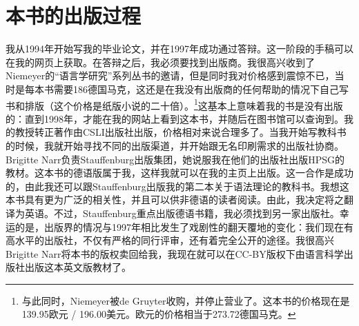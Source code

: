 \section*{本书的出版过程}

我从1994年开始写我的毕业论文，并在1997年成功通过答辩。这一阶段的手稿可以在我的网页上获取。在答辩之后，我必须要找到出版商。我很高兴收到了Niemeyer的“语言学研究”系列丛书的邀请，但是同时我对价格感到震惊不已，当时是每本书需要186德国马克，这还是在我没有出版商的任何帮助的情况下自己写书和排版（这个价格是纸版小说的二十倍）。\footnote{%
与此同时，Niemeyer被de Gruyter收购，并停止营业了。这本书的价格现在是139.95欧元 / 196.00美元。欧元的价格相当于273.72德国马克。
}这基本上意味着我的书是没有出版的：直到1998年，才能在我的网站上看到这本书，并随后在图书馆可以查询到。我的教授转正著作由CSLI出版社出版，价格相对来说合理多了。当我开始写教科书的时候，我就开始寻找不同的出版渠道，并开始跟无名印刷需求的出版社协商。Brigitte Narr负责Stauffenburg出版集团，她说服我在他们的出版社出版HPSG的教材。这本书的德语版属于我，这样我就可以在我的主页上出版。这一合作是成功的，由此我还可以跟Stauffenburg出版我的第二本关于语法理论的教科书。我想这本书具有更为广泛的相关性，并且可以供非德语的读者阅读。由此，我决定将之翻译为英语。不过，Stauffenburg重点出版德语书籍，我必须找到另一家出版社。幸运的是，出版界的情况与1997年相比发生了戏剧性的翻天覆地的变化：我们现在有高水平的出版社，不仅有严格的同行评审，还有着完全公开的途径。我很高兴Brigitte Narr将本书的版权卖回给我，我现在就可以在CC-BY版权下由语言科学出版社出版这本英文版教材了。
